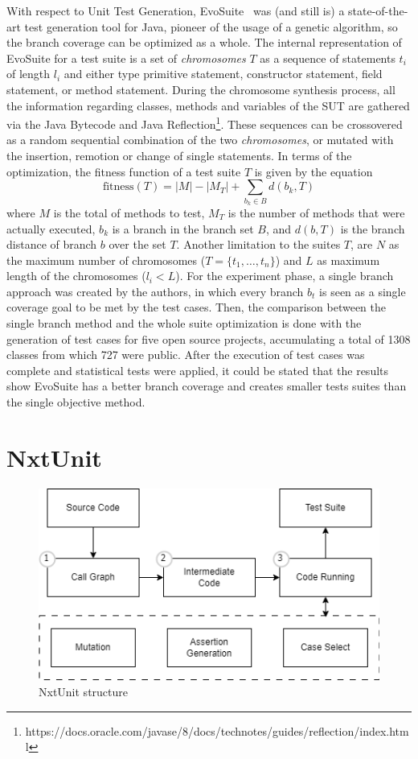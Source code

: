 \documentclass[%
  chapterprefix=false,%
  open=right,%
  twoside=true,%
  paper=a4,%
  logofile={Figures/logo.png},%
  thesistype=master,%
  UKenglish,%
]{se2thesis}
\begin{document}
With respect to Unit Test Generation, EvoSuite~\cite{DBLP:conf/qsic/FraserA11} was (and still is) a state-of-the-art test generation tool for Java, pioneer of the usage of a genetic algorithm, so the branch coverage can be optimized as a whole.
The internal representation of EvoSuite for a test suite is a set of \textit{chromosomes} \(T\) as a sequence of statements \(t_i\) of length \(l_i\) and either type primitive statement, constructor statement, field statement, or method statement.
During the chromosome synthesis process, all the information regarding classes, methods and variables of the SUT are gathered via the Java Bytecode and Java Reflection\footnote{https://docs.oracle.com/javase/8/docs/technotes/guides/reflection/index.html}.
These sequences can be crossovered as a random sequential combination of the two \textit{chromosomes}, or mutated with the insertion, remotion or change of single statements.
In terms of the optimization, the fitness function of a test suite $T$ is given by the equation
\[ \text{fitness}(T) = |M| - |M_T| + \sum_{b_k \in B} d(b_k, T) \]
where $M$ is the total of methods to test, \(M_T\) is the number of methods that were actually executed, \(b_k\) is a branch in the branch set \(B\), and \(d(b, T)\) is the branch distance of branch \(b\) over the set \(T\).
Another limitation to the suites \(T\), are \(N\) as the maximum number of chromosomes (\(T = \{t_1, \dots , t_n\}\)) and \(L\) as maximum length of the chromosomes (\(l_i < L\)).
For the experiment phase, a single branch approach was created by the authors, in which every branch \(b_t\) is seen as a single coverage goal to be met by the test cases.
Then, the comparison between the single branch method and the whole suite optimization is done with the generation of test cases for five open source projects, accumulating a total of 1308 classes from which 727 were public.
After the execution of test cases was complete and statistical tests were applied, it could be stated that the results show EvoSuite has a better branch coverage and creates smaller tests suites than the single objective method.

\section{NxtUnit}

\begin{figure}[bt]
  \centering
  \includegraphics[width=.99\textwidth]{Figures/nxtunit2.png}
  \caption{NxtUnit structure}\label{fig:nxt}
\end{figure}
\end{document}
